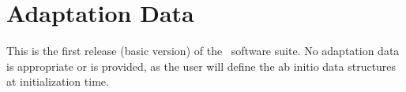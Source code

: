 \documentclass[twoside,11pt,titlepage]{report}
\begin{document}
\section{Adaptation Data}
This is the first release (basic version) of the \MODEL\ software suite.
No adaptation data is appropriate or is provided, as the user will
define the ab initio data structures at initialization time.

\newpage
{}


\end{document}
